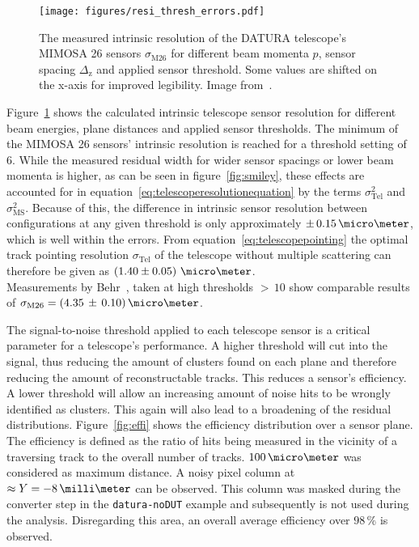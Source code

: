 \begin{figure}[tbp]
\centering

\texttt{[image: figures/resi\_thresh\_errors.pdf]}
\caption[Telescope intrinsic sensor resolution for different threshold settings, beam momenta and geometries~\cite{ref:thomas}]{
 The measured intrinsic resolution of the DATURA telescope's MIMOSA 26 sensors $\sigma_{\textrm{M26}}$ for different beam momenta $p$, sensor spacing $\Delta_{\textrm{z}}$ and applied sensor threshold.
Some values are shifted on the x-axis for improved legibility.
Image from~\cite{ref:thomas}.}
\label{fig:resivsenergy}
\end{figure}

Figure~\ref{fig:resivsenergy} shows the calculated intrinsic telescope sensor resolution for different beam energies, plane distances and applied sensor thresholds.
The minimum of the MIMOSA 26 sensors' intrinsic resolution is reached for a threshold setting of $6$.
While the measured residual width for wider sensor spacings or lower beam momenta is higher, as can be seen in figure~\ref{fig:smiley},
 these effects are accounted for in equation~\ref{eq:telescoperesolutionequation} by the terms $\sigma_{\textrm{Tel}}^2$ and $\sigma_{\textrm{MS}}^2$.
Because of this, the difference in intrinsic sensor resolution between configurations at any given threshold is only approximately $\pm\,0.15\,\micro\meter$, which is well within the errors.
From equation~\ref{eq:telescopepointing} the optimal track pointing resolution $\sigma_{\textrm{Tel}}$ of the \DATURA telescope without multiple scattering
 can therefore be given as $\left( 1.40 \pm 0.05 \right)\,\micro\meter$.\\
Measurements by Behr~\cite{ref:j.behrmeasurements}, taken at high thresholds $>\,10$ show comparable results of $\sigma_{\textrm{M26}} = (4.35\,\pm\,0.10)\,\micro\meter$.

The signal-to-noise threshold applied to each telescope sensor is a critical parameter for a telescope's performance.
A higher threshold will cut into the signal, thus reducing the amount of clusters found on each plane and therefore reducing the amount of reconstructable tracks.
This reduces a sensor's efficiency.
A lower threshold will allow an increasing amount of noise hits to be wrongly identified as clusters.
This again will also lead to a broadening of the residual distributions.
Figure~\ref{fig:effi} shows the efficiency distribution over a sensor plane.
The efficiency is defined as the ratio of hits being measured in the vicinity of a traversing track to the overall number of tracks.
$100\,\micro\meter$ was considered as maximum distance.
A noisy pixel column at $\approx Y = -8\,\milli\meter$ can be observed.
This column was masked during the converter step in the \texttt{datura-noDUT} example and subsequently is not used during the analysis.
Disregarding this area, an overall average efficiency over $98\,\%$ is observed.

